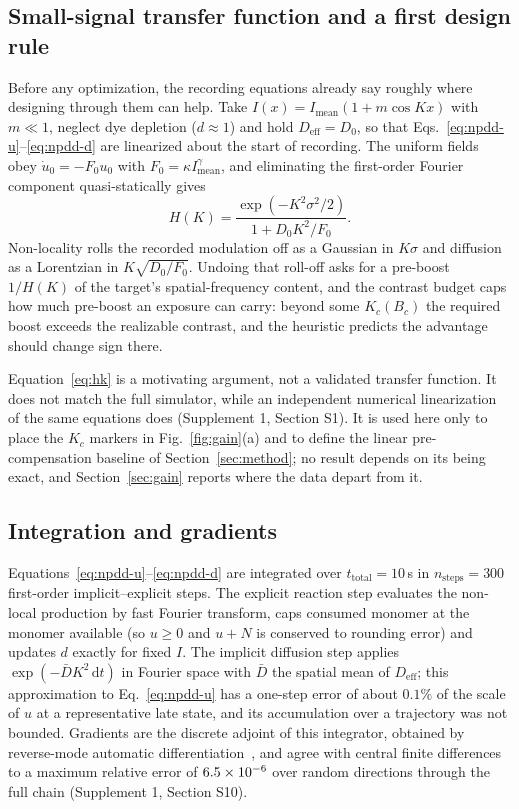 \documentclass{optica-article}
\begin{document}
\subsection{Small-signal transfer function and a first design rule}
\label{sec:model-mtf}
Before any optimization, the recording equations already say roughly where
designing through them can help. Take $I(x)=I_{\text{mean}}(1+m\cos Kx)$ with
$m\ll1$, neglect dye depletion ($d\approx1$) and hold
$D_{\text{eff}}=D_0$, so that Eqs.~\eqref{eq:npdd-u}--\eqref{eq:npdd-d} are
linearized about the start of recording. The uniform fields obey
$\dot u_0=-F_0u_0$ with $F_0=\kappa I_{\text{mean}}^\gamma$, and eliminating
the first-order Fourier component quasi-statically gives
\begin{equation}
\label{eq:hk}
H(K)=\frac{\exp(-K^2\sigma^2/2)}{1+D_0K^2/F_0}.
\end{equation}
Non-locality rolls the recorded modulation off as a Gaussian in $K\sigma$ and
diffusion as a Lorentzian in $K\sqrt{D_0/F_0}$. Undoing that roll-off asks for
a pre-boost $1/H(K)$ of the target's spatial-frequency content, and the
contrast budget caps how much pre-boost an exposure can carry: beyond some
$K_c(B_c)$ the required boost exceeds the realizable contrast, and the
heuristic predicts the advantage should change sign there.

Equation~\eqref{eq:hk} is a motivating argument, not a validated transfer
function. It does not match the full simulator, while an independent numerical
linearization of the same equations does (Supplement 1, Section S1). It is used
here only to place the $K_c$ markers in Fig.~\ref{fig:gain}(a) and to define
the linear pre-compensation baseline of Section~\ref{sec:method}; no result
depends on its being exact, and Section~\ref{sec:gain} reports where the data
depart from it.

\subsection{Integration and gradients}
\label{sec:model-imex}
Equations~\eqref{eq:npdd-u}--\eqref{eq:npdd-d} are integrated over
$t_{\text{total}}=10$\,s in $n_{\text{steps}}=300$ first-order
implicit--explicit steps. The explicit reaction step evaluates the non-local
production by fast Fourier transform, caps consumed monomer at the monomer
available (so $u\ge0$ and $u+N$ is conserved to rounding error) and updates $d$
exactly for fixed $I$. The implicit diffusion step applies
$\exp(-\bar{D}K^2\,\mathrm{d}t)$ in Fourier space with $\bar{D}$ the spatial
mean of $D_{\text{eff}}$; this approximation to Eq.~\eqref{eq:npdd-u} has a
one-step error of about $0.1\%$ of the scale of $u$ at a representative late
state, and its accumulation over a trajectory was not bounded. Gradients are
the discrete adjoint of this integrator, obtained by reverse-mode automatic
differentiation~\cite{griewank2008evaluating,paszke2019pytorch}, and agree with
central finite differences to a maximum relative error of
$6.5\times10^{-6}$ over \GradCheckNDirs{} random directions through the full
chain (Supplement 1, Section S10).
\end{document}
